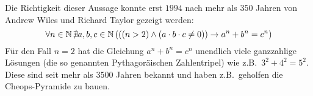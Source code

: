 \setlength{\marginparwidth}{1.7cm}
\begin{example}
Die Richtigkeit dieser Aussage konnte erst $1994$ nach mehr als $350$
Jahren von Andrew Wiles und Richard Taylor gezeigt werden:
\begin{displaymath}
\forall n\in\mathbb N\, \nexists a,b,c \in \mathbb N\, (((n > 2) \wedge
(a \cdot b \cdot c \not= 0)) \rightarrow a^n + b^n
= c^n)  
\end{displaymath}
Für den Fall $n=2$ hat die Gleichung $a^n + b^n
= c^n$ unendlich viele ganzzahlige Lösungen (die so genannten
Pythagoräischen Zahlentripel) wie z.B.~$3^2+4^2=5^2$. Diese sind seit 
mehr als $3500$ Jahren bekannt und haben z.B.~geholfen die
Cheops-Pyramide zu bauen.
\end{example}

